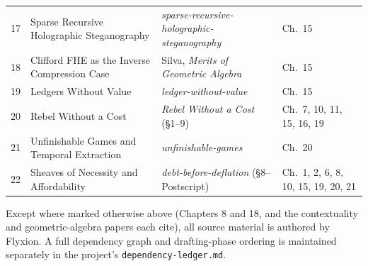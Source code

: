 \begin{longtable}{@{}p{0.6cm}p{4.6cm}p{5.3cm}p{2.3cm}@{}}
17 & Sparse Recursive Holographic Steganography & \textit{sparse-recursive-holographic-steganography} & Ch.\ 15 \\
18 & Clifford FHE as the Inverse Compression Case & Silva, \textit{Merits of Geometric Algebra} \cite{silva2026} & Ch.\ 15 \\
19 & Ledgers Without Value & \textit{ledger-without-value} & Ch.\ 15 \\
20 & Rebel Without a Cost & \textit{Rebel Without a Cost} (\S 1--9) & Ch.\ 7, 10, 11, 15, 16, 19 \\
21 & Unfinishable Games and Temporal Extraction & \textit{unfinishable-games} & Ch.\ 20 \\
22 & Sheaves of Necessity and Affordability & \textit{debt-before-deflation} (\S 8--Postscript) & Ch.\ 1, 2, 6, 8, 10, 15, 19, 20, 21 \\
\bottomrule
\end{longtable}
\endgroup

\noindent Except where marked otherwise above (Chapters 8 and 18, and the contextuality and geometric-algebra papers each cite), all source material is authored by Flyxion. A full dependency graph and drafting-phase ordering is maintained separately in the project's \texttt{dependency-ledger.md}.
